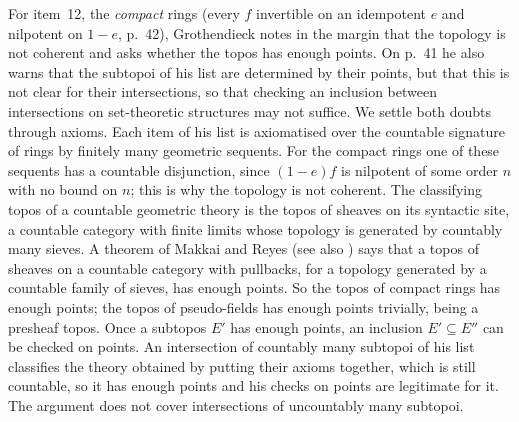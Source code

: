 For item~12, the \emph{compact} rings (every $f$ invertible on an idempotent $e$ and nilpotent on $1-e$, p.~42), Grothendieck notes in the margin that the topology is not coherent and asks whether the topos has enough points. On p.~41 he also warns that the subtopoi of his list are determined by their points, but that this is not clear for their intersections, so that checking an inclusion between intersections on set-theoretic structures may not suffice. We settle both doubts through axioms. Each item of his list is axiomatised over the countable signature of rings by finitely many geometric sequents. For the compact rings one of these sequents has a countable disjunction, since $(1-e)f$ is nilpotent of some order $n$ with no bound on $n$; this is why the topology is not coherent. The classifying topos of a countable geometric theory is the topos of sheaves on its syntactic site, a countable category with finite limits whose topology is generated by countably many sieves. A theorem of Makkai and Reyes \cite[Thm~6.2.4]{makkai-reyes} (see also \cite[Cor.~3.3.10]{diliberti-rogers}) says that a topos of sheaves on a countable category with pullbacks, for a topology generated by a countable family of sieves, has enough points. So the topos of compact rings has enough points; the topos of pseudo-fields has enough points trivially, being a presheaf topos. Once a subtopos $E'$ has enough points, an inclusion $E'\subseteq E''$ can be checked on points. An intersection of countably many subtopoi of his list classifies the theory obtained by putting their axioms together, which is still countable, so it has enough points and his checks on points are legitimate for it. The argument does not cover intersections of uncountably many subtopoi.

